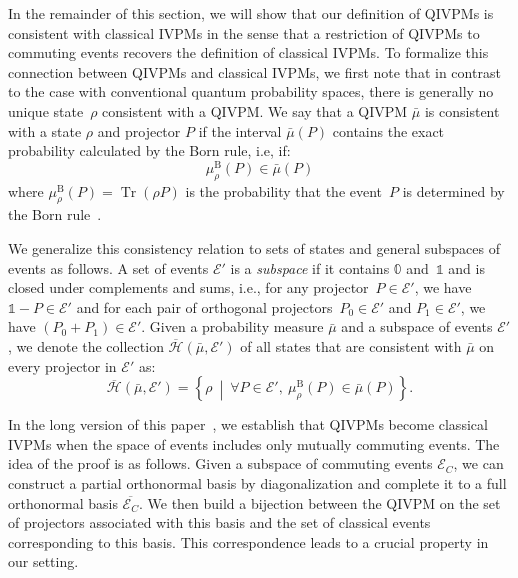 \documentclass[english,reprint, aps, prl,superscriptaddress, showpacs,
showkeys, longbibliography, amsmath, amssymb]{revtex4-1}
\theoremstyle{plain}
\theoremstyle{definition}
\newcommand{\Hilb}{\mathcal{H}}
\newcommand{\events}{\ensuremath{\mathcal{E}}}
\newcommand{\set}[2]{\ensuremath{\left\{ {#1}~\middle|~{#2}\right\} }}
\newcommand{\Tr}{\ensuremath{\mathop{\mathrm{Tr}}\nolimits}}
\newcommand{\coreBorn}{\ensuremath{\overline{\Hilb}}}
\begin{document}
In the remainder of this section, we will show that our definition of
QIVPMs is consistent with classical IVPMs in the sense that a
restriction of QIVPMs to commuting events recovers the definition of
classical IVPMs. To formalize this connection between QIVPMs and
classical IVPMs, we first note that in contrast to the case with
conventional quantum probability spaces, there is generally no unique
state~$\rho$ consistent with a QIVPM. We say that a QIVPM $\bar{\mu}$
is consistent with a state $\rho$ and projector $P$ if the interval
$\bar{\mu}(P)$ contains the exact probability calculated by the Born
rule, i.e, if:
\begin{equation}
\mu_{\rho}^{\mathrm{B}}\left(P\right)\in\bar{\mu}\left(P\right)
\end{equation}
where $\mu_{\rho}^{\mathrm{B}}\left(P\right)=\Tr\left(\rho P\right)$
is the probability that the event~$P$ is determined by the Born
rule~\citep{Born1983,peres1995quantum,544199}.

We generalize this consistency relation to sets of states and general
subspaces of events as follows. A set of events $\events'$ is a
\emph{subspace} if it contains $\mathbb{0}$ and~$\mathbb{1}$ and is
closed under complements and sums, i.e., for any
projector~$P\in\events'$, we have $\mathbb{1}-P\in\events'$ and for
each pair of orthogonal projectors~$P_0 \in \events'$ and
$P_1 \in \events'$, we have $(P_0 + P_1) \in \events'$. Given a
probability measure $\bar{\mu}$ and a subspace of events $\events'$,
we denote the collection $\coreBorn(\bar{\mu},\events')$ of all states
that are consistent with $\bar{\mu}$ on every projector in $\events'$
as:
\begin{equation}
\coreBorn\left(\bar{\mu},\events'\right)=\set{\rho}{\forall P\in \events',~\mu_{\rho}^{\mathrm{B}}\left(P\right)\in\bar{\mu}\left(P\right)}.
\end{equation}

In the long version of this paper~\cite{HOSTunpublished}, we establish that
QIVPMs become classical IVPMs when the space of events includes only mutually
commuting events. The idea of the proof is as follows. Given a
subspace of commuting events $\events_C$, we can construct a partial
orthonormal basis by diagonalization and complete it to a full
orthonormal basis $\overline{\events_C}$. We then build a bijection
between the QIVPM on the set of projectors associated with this basis
and the set of classical events corresponding to this basis. This
correspondence leads to a crucial property in our setting. 
\end{document}
